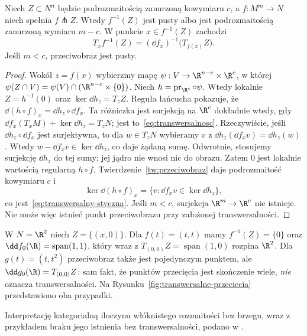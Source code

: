 \begin{twierdzenie}
\label{thm:transwersalny-przeciwobraz}
Niech $Z\subset N^n$ będzie podrozmaitością
zanurzoną kowymiaru $c$, a $f:M^m\to N$
niech spełnia $f\pitchfork Z$. Wtedy
$f^{-1}(Z)$ jest pusty albo jest
podrozmaitością zanurzoną wymiaru $m-c$.
W punkcie $x\in f^{-1}(Z)$ zachodzi
\begin{equation}\label{eq:transwersalny-styczna}
 T_xf^{-1}(Z)
  =(\dd f_x)^{-1}\bigl(T_{f(x)}Z\bigr).
\end{equation}
Jeśli $m<c$, przeciwobraz jest pusty.
\end{twierdzenie}
\begin{proof}
Wokół $z=f(x)$ wybierzmy mapę
$\psi:V\to\R^{n-c}\times\R^c$, w której
$\psi(Z\cap V)=\psi(V)\cap(\R^{n-c}\times\{0\})$.
Niech $h=\operatorname{pr}_{\R^c}\circ\psi$.
Wtedy lokalnie $Z=h^{-1}(0)$ oraz
$\ker\dd h_z=T_zZ$.
Reguła łańcucha pokazuje, że
$\dd(h\circ f)_x=\dd h_z\circ\dd f_x$.
Ta różniczka jest surjekcją na $\R^c$
dokładnie wtedy, gdy
$\dd f_x(T_xM)+\ker\dd h_z=T_zN$;
jest to~\eqref{eq:transwersalnosc}.
Rzeczywiście, jeśli $\dd h_z\circ\dd f_x$ jest surjektywna,
to dla $w\in T_zN$ wybieramy $v$ z
$\dd h_z(\dd f_xv)=\dd h_z(w)$.
Wtedy $w-\dd f_xv\in\ker\dd h_z$, co daje żądaną sumę.
Odwrotnie, stosujemy surjekcję $\dd h_z$ do tej sumy;
jej jądro nie wnosi nic do obrazu.
Zatem $0$ jest lokalnie wartością regularną
$h\circ f$. Twierdzenie~\ref{tw:przeciwobraz}
daje podrozmaitość kowymiaru $c$ i
\[
 \ker\dd(h\circ f)_x
  =\{v:\dd f_xv\in\ker\dd h_z\},
\]
co jest~\eqref{eq:transwersalny-styczna}.
Jeśli $m<c$, surjekcja $\R^m\to\R^c$
nie istnieje. Nie może więc istnieć punkt
przeciwobrazu przy założonej transwersalności.
\end{proof}

\begin{przyklad}
W $N=\R^2$ niech $Z=\{(x,0)\}$.
Dla $f(t)=(t,t)$ mamy
$f^{-1}(Z)=\{0\}$ oraz
$\dd f_0(\R)=\operatorname{span}(1,1)$,
który wraz z $T_{(0,0)}Z=\operatorname{span}(1,0)$
rozpina $\R^2$. Dla $g(t)=(t,t^2)$
przeciwobraz także jest pojedynczym punktem,
ale $\dd g_0(\R)=T_{(0,0)}Z$:
sam fakt, że punktów przecięcia jest skończenie
wiele, \emph{nie} oznacza transwersalności.
Na Rysunku~\ref{fig:transwersalne-przeciecia}
przedstawiono oba przypadki.
\end{przyklad}

Interpretację kategorialną iloczynu włóknistego rozmaitości bez brzegu, wraz z przykładem braku jego istnienia bez transwersalności, podano w .

